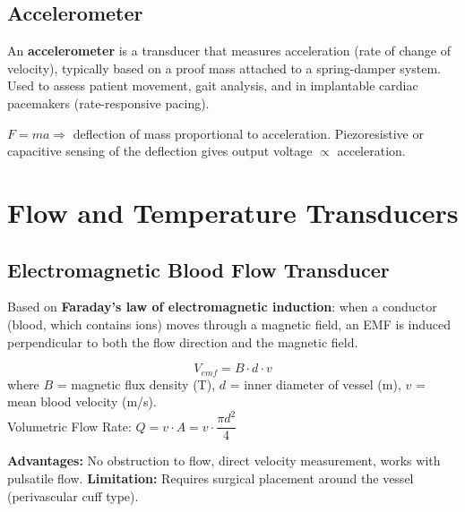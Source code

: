 \documentclass[12pt,a4paper]{article}
\begin{document}
\subsection{Accelerometer}

\begin{tcolorbox}[defbox, title={\textbf{Accelerometer}}]
An \textbf{accelerometer} is a transducer that measures acceleration (rate of change of velocity), typically based on a proof mass attached to a spring-damper system. Used to assess patient movement, gait analysis, and in implantable cardiac pacemakers (rate-responsive pacing).
\end{tcolorbox}

$F = ma \Rightarrow$ deflection of mass proportional to acceleration. Piezoresistive or capacitive sensing of the deflection gives output voltage $\propto$ acceleration.

\section{Flow and Temperature Transducers}

\subsection{Electromagnetic Blood Flow Transducer}

\begin{tcolorbox}[defbox, title={\textbf{Electromagnetic Flowmeter}}]
Based on \textbf{Faraday's law of electromagnetic induction}: when a conductor (blood, which contains ions) moves through a magnetic field, an EMF is induced perpendicular to both the flow direction and the magnetic field.
\end{tcolorbox}

\begin{tcolorbox}[formulabox, title={\textbf{Electromagnetic Flowmeter Formula}}]
\[
V_{emf} = B \cdot d \cdot v
\]
where $B$ = magnetic flux density (T), $d$ = inner diameter of vessel (m), $v$ = mean blood velocity (m/s). \\[4pt]
Volumetric Flow Rate: $Q = v \cdot A = v \cdot \dfrac{\pi d^2}{4}$
\end{tcolorbox}

\textbf{Advantages:} No obstruction to flow, direct velocity measurement, works with pulsatile flow. \textbf{Limitation:} Requires surgical placement around the vessel (perivascular cuff type).
\end{document}

